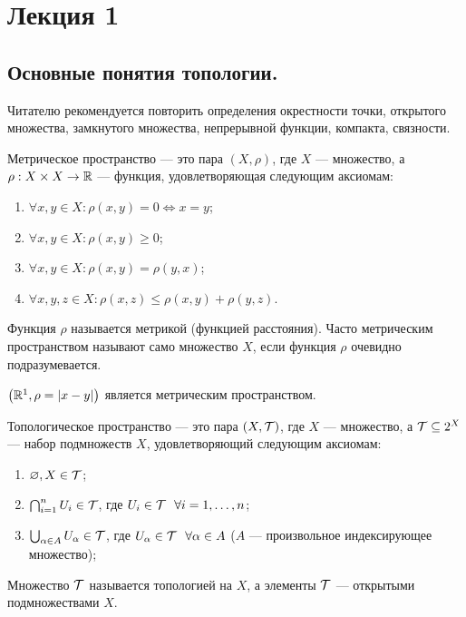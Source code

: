 \section{Лекция 1}
\subsection{Основные понятия топологии.}

Читателю рекомендуется повторить определения окрестности точки, открытого множества, замкнутого множества, непрерывной функции, компакта, связности.

\begin{definition}
    Метрическое пространство --- это пара $(X, \rho)$, где $X$ --- множество, а $\rho: X \times X \rightarrow \mathbb{R}$ --- функция, удовлетворяющая следующим аксиомам:
    \begin{enumerate}
        \item $\forall x,y \in X: \rho(x,y) = 0 \Leftrightarrow x = y$;
        \item $\forall x,y \in X: \rho(x,y) \geq 0$;
        \item $\forall x,y \in X: \rho(x,y) = \rho(y,x)$;
        \item $\forall x,y,z \in X: \rho(x,z) \leq \rho(x,y) + \rho(y,z)$.
    \end{enumerate}
    Функция $\rho$ называется метрикой (функцией расстояния). Часто метрическим пространством называют само множество $X$, если функция $\rho$ очевидно подразумевается.
\end{definition}

\begin{statement}
    $\left(\mathbb{R}^1 , \rho = \left|x - y\right|\right)$ является метрическим пространством.
\end{statement}

\begin{definition}
    Топологическое пространство --- это пара $(X, \mathcal{T})$, где $X$ --- множество, а $\mathcal{T}  \subseteq 2^X$ --- набор подмножеств $X$, удовлетворяющий следующим аксиомам:
    \begin{enumerate}
        \item $\varnothing,X \in \mathcal{T}$;
        \item $\bigcap_{i = 1}^{n}U_i \in \mathcal{T}$, где $U_i \in \mathcal{T} \ \ \forall i = 1, \ldots, n$;
        \item $\bigcup_{\alpha \in A} U_{\alpha} \in \mathcal{T}$, где $U_{\alpha} \in \mcT \ \ \forall \alpha \in A$ ($A$ --- произвольное индексирующее множество);
    \end{enumerate}
    Множество $\mathcal{T}$ называется топологией на $X$, а элементы $\mathcal{T}$ --- открытыми подмножествами $X$.
\end{definition}

